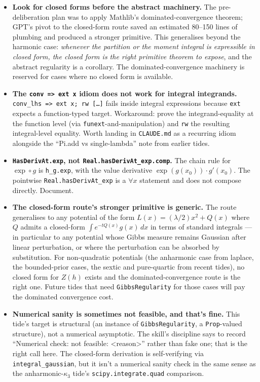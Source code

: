 \documentclass[11pt]{article}
\begin{document}
\begin{itemize}
\item \textbf{Look for closed forms before the abstract machinery.}
The pre-deliberation plan was to apply Mathlib's
dominated-convergence theorem; GPT's pivot to the closed-form route
saved an estimated 80--150 lines of plumbing and produced a stronger
primitive.
This generalises beyond the harmonic case: \emph{whenever the
partition or the moment integral is expressible in closed form, the
closed form is the right primitive theorem to expose}, and the
abstract regularity is a corollary. The dominated-convergence
machinery is reserved for cases where no closed form is available.

\item \textbf{The \texttt{conv => ext x} idiom does not work for
integral integrands.} \texttt{conv\_lhs => ext x; rw [\dots]} fails
inside integral expressions because \texttt{ext} expects a
function-typed target. Workaround: prove the integrand-equality at
the function level (via \texttt{funext}-and-manipulation) and
\texttt{rw} the resulting integral-level equality. Worth landing in
\texttt{CLAUDE.md} as a recurring idiom alongside the
``Pi.add vs single-lambda'' note from earlier tides.

\item \textbf{\texttt{HasDerivAt.exp}, not
\texttt{Real.hasDerivAt\_exp.comp}.} The chain rule for $\exp \circ g$
is \texttt{h\_g.exp}, with the value derivative
$\exp(g(x_0)) \cdot g'(x_0)$. The pointwise
\texttt{Real.hasDerivAt\_exp} is a $\forall x$ statement and does not
compose directly. Document.

\item \textbf{The closed-form route's stronger primitive is generic.}
The route generalises to any potential of the form
$L(x) = (\lambda/2) x^2 + Q(x)$ where $Q$ admits a closed-form
$\int e^{-tQ(x)} g(x)\,dx$ in terms of standard integrals --- in
particular to any potential whose Gibbs measure remains Gaussian after
linear perturbation, or where the perturbation can be absorbed by
substitution. For non-quadratic potentials (the anharmonic case from
laplace, the bounded-prior cases, the sextic and pure-quartic from
recent tides), no closed form for $Z(h)$ exists and the
dominated-convergence route is the right one. Future tides that need
\texttt{GibbsRegularity} for those cases will pay the dominated
convergence cost.

\item \textbf{Numerical sanity is sometimes not feasible, and that's
fine.} This tide's target is structural (an instance of
\texttt{GibbsRegularity}, a \texttt{Prop}-valued structure), not a
numerical asymptotic. The skill's discipline says to record
``\textsection Numerical check: not feasible: <reason>'' rather than
fake one; that is the right call here. The closed-form derivation is
self-verifying via \texttt{integral\_gaussian}, but it isn't a
numerical sanity check in the same sense as the
anharmonic-$\kappa_3$ tide's \texttt{scipy.integrate.quad}
comparison.
\end{itemize}
\end{document}
